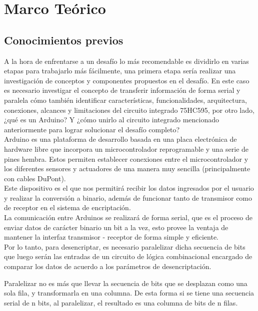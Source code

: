 \documentclass{article}
\begin{document}
\vspace{3cm}

\section{Marco Teórico}\label{marco}

\subsection{Conocimientos previos}

A la hora de enfrentarse a un desafío lo más recomendable es dividirlo en varias etapas para trabajarlo más fácilmente, una primera etapa sería realizar una investigación de conceptos y componentes propuestos en el desafío. En este caso es necesario investigar el concepto de transferir información de forma serial y paralela cómo también identificar características, funcionalidades, arquitectura, conexiones, alcances y limitaciones del circuito integrado 75HC595, por otro lado, ¿qué es un Arduino? Y ¿cómo unirlo al circuito integrado mencionado anteriormente para lograr solucionar el desafío completo?\\

Arduino es una plataforma de desarrollo basada en una placa electrónica de hardware libre que incorpora un microcontrolador reprogramable  y una serie de pines hembra. Estos permiten establecer conexiones entre el microcontrolador y los diferentes sensores y actuadores de una manera muy sencilla (principalmente con cables DuPont).\cite{arduinowebsite}\\

Este dispositivo es el que nos permitirá recibir los datos ingresados por el usuario y realizar la conversión a binario, además de funcionar tanto de transmisor como de receptor en el sistema de encriptación.\\

La comunicación entre Arduinos se realizará de forma serial, que es el proceso de enviar datos de carácter binario un bit a la vez, esto provee la ventaja de mantener la interfaz transmisor - receptor de forma simple y eficiente.\cite{serialsite}\\
Por lo tanto, para desencriptar, es necesario paralelizar dicha secuencia de bits que luego serán las entradas de un circuito de lógica combinacional encargado de comparar los datos de acuerdo a los parámetros de desencriptación.

Paralelizar no es más que llevar la secuencia de bits que se desplazan como una sola fila, y transformarla en una columna. De esta forma si se tiene una secuencia serial de n bits, al paralelizar, el resultado es una columna de bits de n filas.
\end{document}
